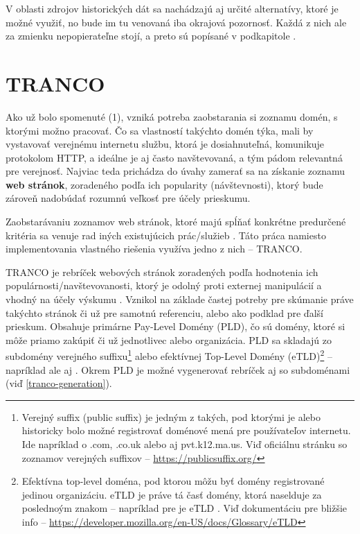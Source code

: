 V oblasti zdrojov historických dát sa nachádzajú aj určité alternatívy, ktoré je možné využiť, no bude im tu venovaná iba okrajová
pozornosť. Každá z nich ale za zmienku nepopierateľne stojí, a preto sú popísané v podkapitole .


\section{TRANCO}

Ako už bolo spomenuté (1), vzniká potreba zaobstarania si zoznamu domén, s ktorými možno pracovať. Čo sa vlastností takýchto domén týka,
mali by vystavovať verejnému internetu službu, ktorá je dosiahnuteľná, komunikuje protokolom HTTP, a ideálne je aj často navštevovaná,
a tým pádom relevantná pre verejnosť. Najviac teda prichádza do úvahy zamerať sa na získanie zoznamu \textbf{web stránok}, zoradeného podľa
ich popularity (návštevnosti), ktorý bude zároveň nadobúdať rozumnú veľkosť pre účely prieskumu. 

Zaobstarávaniu zoznamov web stránok, ktoré majú spĺňať konkrétne predurčené kritéria sa venuje rad iných existujúcich prác/služieb 
\cite{tranco}\cite{hacker-target-website-lists-overview}. Táto práca namiesto implementovania vlastného riešenia využíva jedno z nich -- TRANCO.

TRANCO je rebríček webových stránok zoradených podľa hodnotenia ich populárnosti/navštevovanosti, ktorý je odolný proti externej manipulácií a vhodný na účely výskumu \cite{tranco-homepage}. 
Vznikol na základe častej potreby pre skúmanie práve takýchto stránok či už pre samotnú referenciu, alebo ako podklad pre ďalší prieskum.
Obsahuje primárne Pay-Level Domény (PLD), čo sú domény, ktoré si môže priamo zakúpiť či už jednotlivec alebo organizácia. PLD sa skladajú zo subdomény verejného 
suffixu\footnote{Verejný suffix (public suffix) je jedným z takých, pod ktorými je alebo historicky bolo možné registrovať doménové mená pre používateľov internetu. Ide napríklad o .com, .co.uk 
alebo aj pvt.k12.ma.us. Viď oficiálnu stránku so zoznamov verejných suffixov -- \href{https://publicsuffix.org/}{https://publicsuffix.org/}} 
alebo efektívnej Top-Level Domény (eTLD)\footnote{Efektívna top-level doména, pod ktorou môžu byť domény registrované jedinou organizáciu. eTLD je práve tá časť domény, ktorá naselduje za poslednoým 
znakom  -- napríklad pre  je eTLD . Viď dokumentáciu pre bližšie info -- \href{https://developer.mozilla.org/en-US/docs/Glossary/eTLD}
{https://developer.mozilla.org/en-US/docs/Glossary/eTLD}} -- napríklad  ale aj  \cite{tranco}. Okrem PLD je možné vygenerovať rebríček aj so subdoménami (viď 
\ref{tranco-generation}).

